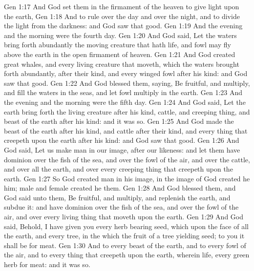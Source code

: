 \vs Gen 1:17 And God set them in the firmament of the heaven to give light upon the earth,
\vs Gen 1:18 And to rule over the day and over the night, and to divide the light from the darkness: and God saw that  good.
\vs Gen 1:19 And the evening and the morning were the fourth day.
\vs Gen 1:20 And God said, Let the waters bring forth abundantly the moving creature that hath life, and fowl  may fly above the earth in the open firmament of heaven.
\vs Gen 1:21 And God created great whales, and every living creature that moveth, which the waters brought forth abundantly, after their kind, and every winged fowl after his kind: and God saw that  good.
\vs Gen 1:22 And God blessed them, saying, Be fruitful, and multiply, and fill the waters in the seas, and let fowl multiply in the earth.
\vs Gen 1:23 And the evening and the morning were the fifth day.
\vs Gen 1:24 And God said, Let the earth bring forth the living creature after his kind, cattle, and creeping thing, and beast of the earth after his kind: and it was so.
\vs Gen 1:25 And God made the beast of the earth after his kind, and cattle after their kind, and every thing that creepeth upon the earth after his kind: and God saw that  good.
\vs Gen 1:26 And God said, Let us make man in our image, after our likeness: and let them have dominion over the fish of the sea, and over the fowl of the air, and over the cattle, and over all the earth, and over every creeping thing that creepeth upon the earth.
\vs Gen 1:27 So God created man in his  image, in the image of God created he him; male and female created he them.
\vs Gen 1:28 And God blessed them, and God said unto them, Be fruitful, and multiply, and replenish the earth, and subdue it: and have dominion over the fish of the sea, and over the fowl of the air, and over every living thing that moveth upon the earth.
\vs Gen 1:29 And God said, Behold, I have given you every herb bearing seed, which  upon the face of all the earth, and every tree, in the which  the fruit of a tree yielding seed; to you it shall be for meat.
\vs Gen 1:30 And to every beast of the earth, and to every fowl of the air, and to every thing that creepeth upon the earth, wherein  life,  every green herb for meat: and it was so.
